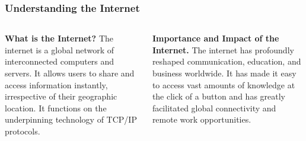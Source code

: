 \documentclass[5pt]{beamer}
\begin{document}
\begin{frame}
\frametitle{Understanding the Internet}
\begin{columns}
\begin{column}{0.45\textwidth}
\begin{block}{\textbf{What is the Internet?}}
The internet is a global network of interconnected computers and servers. It allows users to share and access information instantly, irrespective of their geographic location. It functions on the underpinning technology of TCP/IP protocols.
\end{block}
\end{column}
\begin{column}{0.45\textwidth}
\begin{block}{\textbf{Importance and Impact of the Internet.}}
The internet has profoundly reshaped communication, education, and business worldwide. It has made it easy to access vast amounts of knowledge at the click of a button and has greatly facilitated global connectivity and remote work opportunities.
\end{block}
\end{column}
\end{columns}
\end{frame}
\end{document}

